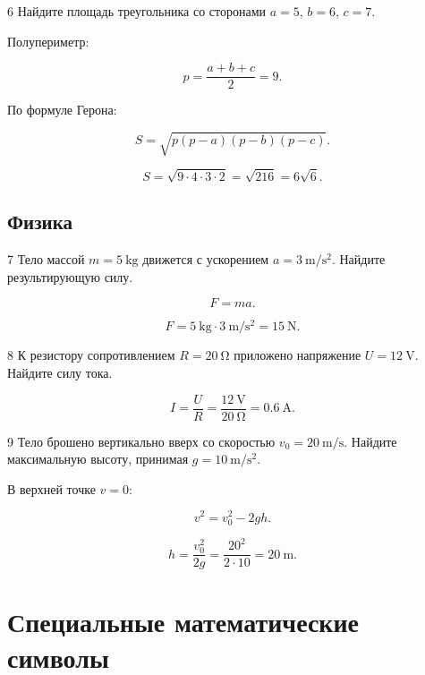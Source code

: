 \documentclass[12pt,a4paper]{article}
\theoremstyle{definition}
\theoremstyle{remark}
\begin{document}
\begin{taskbox}{6}
Найдите площадь треугольника со сторонами
$a=5$, $b=6$, $c=7$.

Полупериметр:

\[
    p
    =
    \frac{a+b+c}{2}
    =
    9.
\]

По формуле Герона:

\[
    S
    =
    \sqrt{p(p-a)(p-b)(p-c)}.
\]

\[
    S
    =
    \sqrt{9\cdot4\cdot3\cdot2}
    =
    \sqrt{216}
    =
    6\sqrt{6}.
\]
\end{taskbox}

\subsection{Физика}

\begin{taskbox}{7}
Тело массой $m=\SI{5}{\kilogram}$ движется с ускорением
$a=\SI{3}{\meter\per\second\squared}$. Найдите результирующую силу.

\[
    F=ma.
\]

\[
    F
    =
    \SI{5}{\kilogram}
    \cdot
    \SI{3}{\meter\per\second\squared}
    =
    \SI{15}{\newton}.
\]
\end{taskbox}

\begin{taskbox}{8}
К резистору сопротивлением $R=\SI{20}{\ohm}$ приложено напряжение
$U=\SI{12}{\volt}$. Найдите силу тока.

\[
    I
    =
    \frac{U}{R}
    =
    \frac{\SI{12}{\volt}}{\SI{20}{\ohm}}
    =
    \SI{0.6}{\ampere}.
\]
\end{taskbox}

\begin{taskbox}{9}
Тело брошено вертикально вверх со скоростью
$v_0=\SI{20}{\meter\per\second}$. Найдите максимальную высоту,
принимая $g=\SI{10}{\meter\per\second\squared}$.

В верхней точке $v=0$:

\[
    v^2=v_0^2-2gh.
\]

\[
    h
    =
    \frac{v_0^2}{2g}
    =
    \frac{20^2}{2\cdot10}
    =
    \SI{20}{\meter}.
\]
\end{taskbox}


\section{Специальные математические символы}
\end{document}
